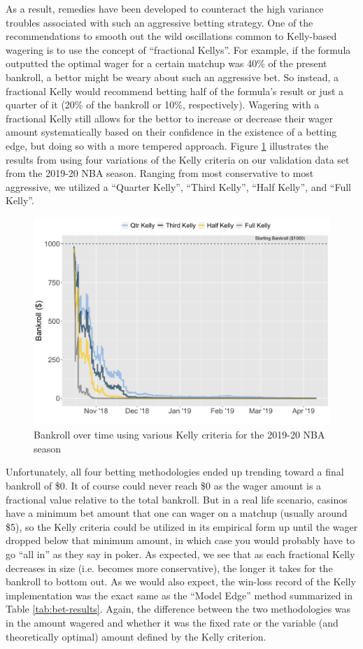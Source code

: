\documentclass [MS] {uclathes}
\begin{document}
As a result, remedies have been developed to counteract the high variance troubles associated with such an aggressive betting strategy. One of the recommendations to smooth out the wild oscillations common to Kelly-based wagering is to use the concept of ``fractional Kellys''. \cite{thorp} For example, if the formula outputted the optimal wager for a certain matchup was 40\% of the present bankroll, a bettor might be weary about such an aggressive bet. So instead, a fractional Kelly would recommend betting half of the formula's result or just a quarter of it (20\% of the bankroll or 10\%, respectively). Wagering with a fractional Kelly still allows for the bettor to increase or decrease their wager amount systematically based on their confidence in the existence of a betting edge, but doing so with a more tempered approach. Figure \ref{fig:bet-perf-kc} illustrates the results from using four variations of the Kelly criteria on our validation data set from the 2019-20 NBA season. Ranging from most conservative to most aggressive, we utilized a ``Quarter Kelly'', ``Third Kelly'', ``Half Kelly'', and ``Full Kelly''.

\begin{figure}[h]
\centering
  \includegraphics[width=450px]{bet-performance-kc.png}
  \caption{Bankroll over time using various Kelly criteria for the 2019-20 NBA season}
  \label{fig:bet-perf-kc}
\end{figure}

Unfortunately, all four betting methodologies ended up trending toward a final bankroll of \$0. It of course could never reach \$0 as the wager amount is a fractional value relative to the total bankroll. But in a real life scenario, casinos have a minimum bet amount that one can wager on a matchup (usually around \$5), so the Kelly criteria could be utilized in its empirical form up until the wager dropped below that minimum amount, in which case you would probably have to go ``all in'' as they say in poker. As expected, we see that as each fractional Kelly decreases in size (i.e. becomes more conservative), the longer it takes for the bankroll to bottom out. As we would also expect, the win-loss record of the Kelly implementation was the exact same as the ``Model Edge'' method summarized in Table \ref{tab:bet-results}. Again, the difference between the two methodologies was in the amount wagered and whether it was the fixed rate or the variable (and theoretically optimal) amount defined by the Kelly criterion. 
\end{document}
